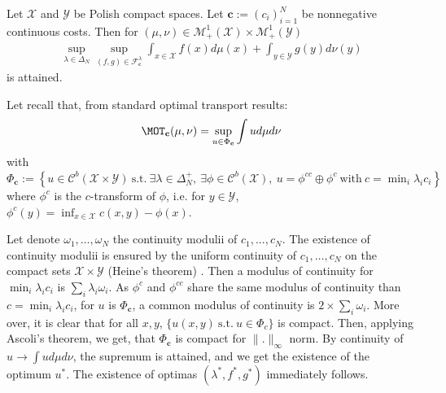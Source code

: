 \begin{prop}
Let $\mathcal{X}$ and $\mathcal{Y}$ be Polish compact spaces. Let $\mathbf{c}:=(c_i)_{i=1}^{N}$ be nonnegative continuous costs. Then for $(\mu,\nu)\in\mathcal{M}_{+}^{1}(\mathcal{X})\times\mathcal{M}_{+}^{1}(\mathcal{Y})$
\begin{align*}
  \sup_{\lambda\in\Delta_N} \sup\limits_{(f,g)\in\mathcal{F}_{\mathbf{c}}^{\lambda}}\int_{x\in\mathcal{X}} f(x)d\mu(x)+ \int_{y\in\mathcal{Y}} g(y)d\nu(y)
\end{align*}
is attained.
\end{prop}
\begin{prv}
Let recall that, from standard optimal transport results:
\begin{align*}
    \MOT_\mathbf{c}(\mu,\nu) = \sup_{u\in\Phi_\mathbf{c}}\int u d\mu d\nu
\end{align*}
with $\Phi_\mathbf{c}:=\left\{u\in\mathcal{C}^b(\mathcal{\mathcal{X}\times\mathcal{Y}}) ~\mathrm{s.t.}~ \exists\lambda \in \Delta_N^+,~\exists\phi\in\mathcal{C}^b(\mathcal{X}),~ u =\phi^{cc}\oplus\phi^c~\mathrm{with}~c=\min_i\lambda_ic_i\right\}$ where $\phi^c$ is the $c$-transform of $\phi$, i.e. for $y\in\mathcal{Y}$, $\phi^c(y)=\inf_{x\in\mathcal{X}}c(x,y)-\phi(x)$. 

Let denote $\omega_1,\dots,\omega_N$ the continuity modulii of $c_1,...,c_N$. The existence of continuity modulii is ensured by the uniform continuity of $c_1,\dots,c_N$ on the compact sets $\mathcal{X}\times\mathcal{Y}$ (Heine's theorem) . Then a modulus of continuity for $\min_i\lambda_ic_i$ is $\sum_i\lambda_i\omega_i$. As $\phi^c$ and $\phi^{cc}$ share the same modulus of continuity than $c=\min_i\lambda_ic_i$, for $u$ is $\Phi_\mathbf{c}$, a common modulus of continuity is $2\times\sum_i\omega_i$. More over, it is clear that for all $x,y$, $\{u(x,y)~\mathrm{s.t.}~u\in \Phi_c\}$ is compact. Then, applying Ascoli's theorem, we get, that $\Phi_{\mathbf{c}}$ is compact for $\lVert.\rVert_\infty$ norm. By continuity of $u\to\int u d\mu d\nu$, the supremum is attained, and we get the existence of the optimum $u^*$. The existence of optimas $(\lambda^*,f^*,g^*)$ immediately follows.
\end{prv}


